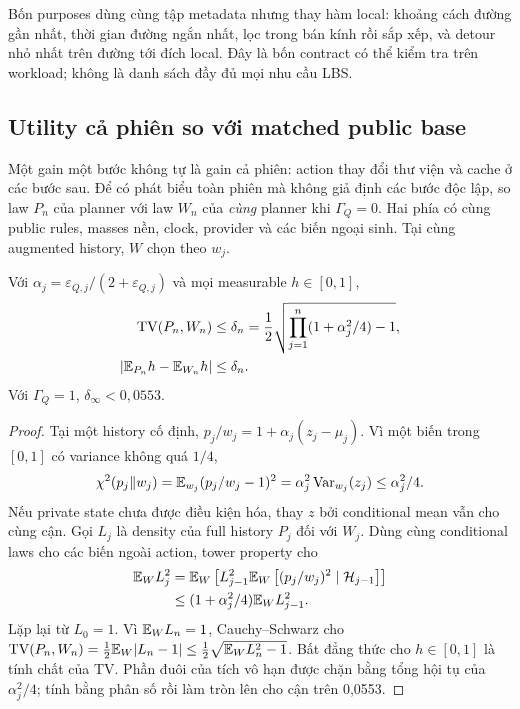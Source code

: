 Bốn purposes dùng cùng tập metadata nhưng thay hàm local: khoảng cách đường gần nhất, thời gian
đường ngắn nhất, lọc trong bán kính rồi sắp xếp, và detour nhỏ nhất trên đường tới đích local.
Đây là bốn contract có thể kiểm tra trên workload; không là danh sách đầy đủ mọi nhu cầu LBS.

\subsection{Utility cả phiên so với matched public base}
Một gain một bước không tự là gain cả phiên: action thay đổi thư viện và cache ở các bước sau.
Để có phát biểu toàn phiên mà không giả định các bước độc lập, so law $P_n$ của planner với law
$W_n$ của \emph{cùng} planner khi $\Gamma_Q=0$. Hai phía có cùng public rules, masses nền, clock,
provider và các biến ngoại sinh. Tại cùng augmented history, $W$ chọn theo $w_j$.

\begin{theorem}\label{thm:utility-session}
Với $\alpha_j=\varepsilon_{Q,j}/(2+\varepsilon_{Q,j})$ và mọi measurable $h\in[0,1]$,
\begin{align}
\operatorname{TV}(P_n,W_n)&\le\delta_n
=\frac12\sqrt{\prod_{j=1}^n(1+\alpha_j^2/4)-1},\label{eq:tv-utility}\\
|\mathbb E_{P_n}h-\mathbb E_{W_n}h|&\le\delta_n.\label{eq:bounded-functional}
\end{align}
Với $\Gamma_Q=1$, $\delta_\infty<0{,}0553$.
\end{theorem}
\begin{proof}
Tại một history cố định, $p_j/w_j=1+\alpha_j(z_j-\mu_j)$. Vì một biến trong $[0,1]$ có variance
không quá $1/4$,
\[
\chi^2(p_j\Vert w_j)=\mathbb E_{w_j}(p_j/w_j-1)^2
=\alpha_j^2\operatorname{Var}_{w_j}(z_j)\le\alpha_j^2/4.
\]
Nếu private state chưa được điều kiện hóa, thay $z$ bởi conditional mean vẫn cho cùng cận.
Gọi $L_j$ là density của full history $P_j$ đối với $W_j$. Dùng cùng conditional laws cho các
biến ngoài action, tower property cho
\begin{align*}
\mathbb E_W L_j^2
&=\mathbb E_W\left[L_{j-1}^2\mathbb E_W\left[(p_j/w_j)^2\mid\mathcal H_{j-1}\right]\right]\\
&\le(1+\alpha_j^2/4)\mathbb E_W L_{j-1}^2.
\end{align*}
Lặp lại từ $L_0=1$. Vì $\mathbb E_W L_n=1$, Cauchy--Schwarz cho
$\operatorname{TV}(P_n,W_n)=\frac12\mathbb E_W|L_n-1|\le\frac12\sqrt{\mathbb E_WL_n^2-1}$.
Bất đẳng thức cho $h\in[0,1]$ là tính chất của TV. Phần đuôi của tích vô hạn được chặn bằng tổng
hội tụ của $\alpha_j^2/4$; tính bằng phân số rồi làm tròn lên cho cận trên 0,0553.
\end{proof}

